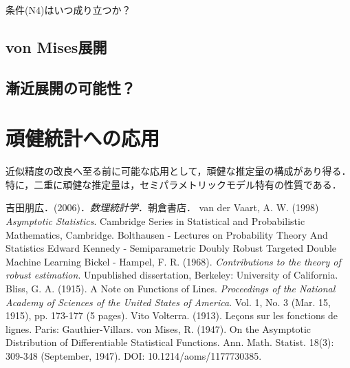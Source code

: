 \documentclass[uplatex, dvipdfmx]{jsarticle}
\begin{document}
条件(N4)はいつ成り立つか？

\subsection{von Mises展開}

\subsection{漸近展開の可能性？}

\section{頑健統計への応用}

\begin{tcolorbox}[colframe=ForestGreen, colback=ForestGreen!10!white,breakable,colbacktitle=ForestGreen!40!white,coltitle=black,fonttitle=\bfseries\sffamily,
title=]
    近似精度の改良へ至る前に可能な応用として，頑健な推定量の構成があり得る．特に，二重に頑健な推定量は，セミパラメトリックモデル特有の性質である．
\end{tcolorbox}

\begin{thebibliography}{99}
    吉田朋広．(2006)．\textit{数理統計学}．朝倉書店．
    van der Vaart, A. W. (1998) \textit{Asymptotic Statistics}. Cambridge Series in Statistical and Probabilistic Mathematics, Cambridge.
    Bolthausen - Lectures on Probability Theory And Statistics
    Edward Kennedy - Semiparametric Doubly Robust Targeted Double Machine Learning
    Bickel - 
    Hampel, F. R. (1968). \textit{Contributions to the theory of robust estimation}. Unpublished dissertation, Berkeley: University of California.
    Bliss, G. A. (1915). A Note on Functions of Lines. \textit{Proceedings of the National Academy of Sciences of the United States of America}. Vol. 1, No. 3 (Mar. 15, 1915), pp. 173-177 (5 pages).
    Vito Volterra. (1913). Le\c{c}ons sur les fonctions de lignes. Paris: Gauthier-Villars.
    von Mises, R. (1947). On the Asymptotic Distribution of Differentiable Statistical Functions.  Ann. Math. Statist. 18(3): 309-348 (September, 1947). DOI: 10.1214/aoms/1177730385.
\end{thebibliography}
\end{document}
